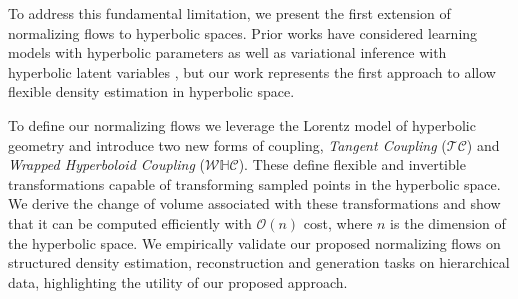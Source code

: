 To address this fundamental limitation, we present the first extension of normalizing flows to hyperbolic spaces. 
Prior works have considered learning models with hyperbolic parameters  \cite{liu2019hyperbolic,nickel2018learning} as well as variational inference with hyperbolic latent variables \cite{nagano2019wrapped,mathieu2019continuous}, but our work represents the first approach to allow flexible density estimation in hyperbolic space. 

To define our normalizing flows we leverage the Lorentz model of hyperbolic geometry and introduce two new forms of coupling, {\em Tangent Coupling} ($\mathcal{TC}$) and {\em Wrapped Hyperboloid Coupling} ($\mathcal{W}\mathbb{H}\mathcal{C}$). These define flexible and invertible transformations capable of transforming sampled points in the hyperbolic space. 
We derive the change of volume associated with these transformations and show that it can be computed efficiently with $\mathcal{O}(n)$ cost, where $n$ is the dimension of the hyperbolic space.
We empirically validate our proposed normalizing flows on structured density estimation, reconstruction and generation tasks on hierarchical data, highlighting the utility of our proposed approach. 

